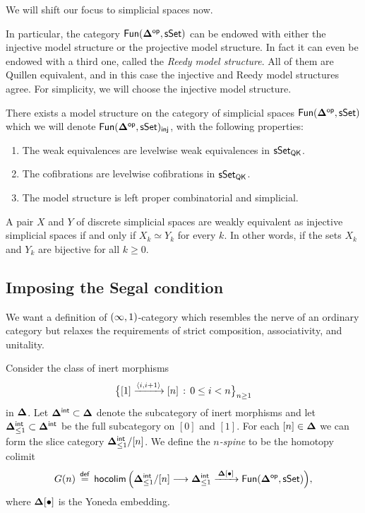 We will shift our focus to simplicial spaces now. 

\begin{observation}\label{ch2:: obs: reedy is injective}
In particular, the category $\operatorname{\sf Fun}(\mathbf\Delta^{\mathsf{op}},\operatorname{\sf sSet})$ can be endowed with
either the injective model structure or the projective model structure. In fact
it can even be endowed with a third one, called the \emph{Reedy model
structure}. All of them are Quillen equivalent, and in this case the injective
and Reedy model structures agree. For simplicity, we will choose the injective
model structure.
\end{observation}

\begin{theorem}
    There exists a model structure on the category of simplicial spaces $\operatorname{\sf Fun}(\mathbf\Delta^{\mathsf{op}},\operatorname{\sf sSet})$ which we will denote $\operatorname{\sf Fun}(\mathbf\Delta^{\mathsf{op}},\operatorname{\sf sSet})_{\sf inj}$, with the following properties:
    \begin{enumerate}
        \item The weak equivalences are levelwise weak equivalences in $\operatorname{\sf sSet}_{\sf QK}$.
        \item The cofibrations are levelwise cofibrations in $\operatorname{\sf sSet}_{\sf QK}$.
        \item The model structure is left proper combinatorial and simplicial.
    \end{enumerate}
\end{theorem}

\begin{observation}
    \label{ch2:: obs: discreteness}
A pair $X$ and $Y$ of discrete simplicial spaces are weakly equivalent as injective simplicial spaces if and only if $X_{k} \simeq Y_{k}$ for every $k$. In other words, if the sets $X_k$ and $Y_k$ are bijective for all $k\geq 0$. 
\end{observation}


\subsection{Imposing the Segal condition}

We want a definition of $(\operatorname{\infty},1)$-category which resembles the nerve of an
ordinary category but relaxes the requirements of strict composition,
associativity, and unitality.

\begin{construction}
Consider the class of inert morphisms
\[
  \big\{[1] \xrightarrow{\langle i, i+1 \rangle} [n]\,:\, 0\leq i < n\big\}_{n \geq 1}
\]
in $\mathbf\Delta$. Let $\mathbf\Delta^{\sf int}\subset\mathbf\Delta$ denote the subcategory of
inert morphisms and let $\mathbf\Delta^{\sf int}_{\leq 1}\subset\mathbf\Delta^{\sf int}$ be
the full subcategory on $[0]$ and $[1]$. For each $[n]\in\mathbf\Delta$ we can form
the slice category $\mathbf\Delta^{\sf int}_{\leq 1}/[n]$. We define the
\emph{$n$-spine} to be the homotopy colimit
\begin{equation}
  G(n) \,\overset{\sf def}{=}\,
  \operatorname{\sf hocolim}\Big(
    \mathbf\Delta^{\sf int}_{\leq 1}/[n]
      \longrightarrow \mathbf\Delta_{\leq 1}^{\sf int}
      \xrightarrow{\,\mathbf\Delta[\bullet]\,}
      \operatorname{{\sf Fun}}(\mathbf\Delta^{\mathsf{op}},\operatorname{\sf sSet})
  \Big),
\end{equation}
where $\mathbf\Delta[\bullet]$ is the Yoneda embedding.
\end{construction}

